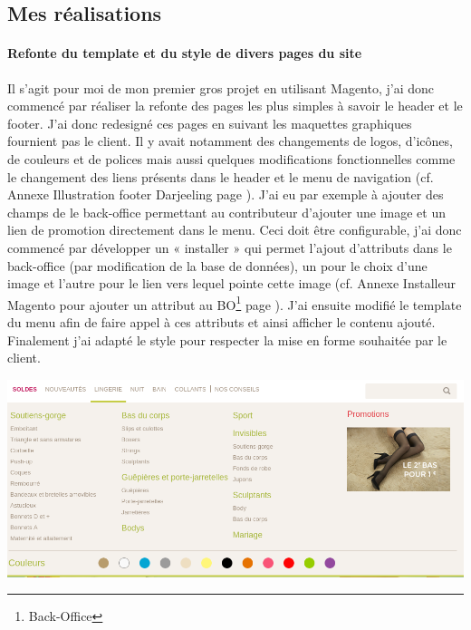 \documentclass[a4paper,11pt,twoside]{report}
\begin{document}
    \subsection*{Mes réalisations}
    	\paragraph*{Refonte du template et du style de divers pages du site}
	Il s'agit pour moi de mon premier gros projet en utilisant Magento, j'ai donc commencé par réaliser la refonte des pages les plus simples à savoir le header et le footer. J'ai donc redesigné ces pages en suivant les maquettes graphiques fournient pas le client. Il y avait notamment des changements de logos, d'icônes, de couleurs et de polices mais aussi quelques modifications fonctionnelles comme le changement des liens présents dans le header et le menu de navigation (cf. Annexe Illustration footer Darjeeling page \pageref{darjeeling_header}). 
	J'ai eu par exemple à ajouter des champs de le back-office permettant au contributeur d'ajouter une image et un lien de promotion directement dans le menu. Ceci doit être configurable, j'ai donc commencé par développer un « installer » qui permet l'ajout d'attributs dans le back-office (par modification de la base de données), un pour le choix d'une image et l'autre pour le lien vers lequel pointe cette image (cf. Annexe Installeur Magento pour ajouter un attribut au BO\footnote{Back-Office} page \pageref{installeur_Magento_pour_ajouter_un_attribut_au_BO}). J'ai ensuite modifié le template du menu afin de faire appel à ces attributs et ainsi afficher le contenu ajouté. Finalement j'ai adapté le style pour respecter la mise en forme souhaitée par le client. 
	
	\begin{center}
	  \includegraphics[width=\textwidth]{images/darjeeling_nav_menu.png} 
	  \label{darjeeling_nav_menu}
	\end{center}
	
\end{document}
